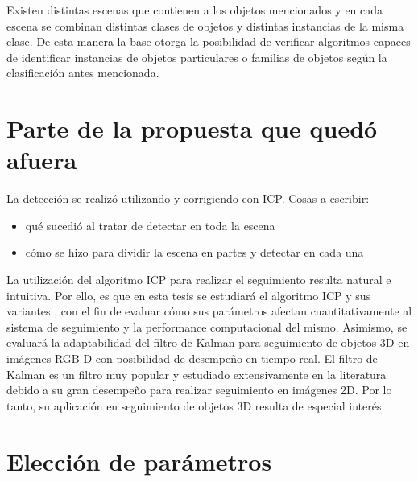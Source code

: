 Existen distintas escenas que contienen a los objetos mencionados y en cada escena se combinan distintas clases de objetos y distintas instancias de la misma clase. De esta manera la base otorga la posibilidad de verificar algoritmos capaces de identificar instancias de objetos particulares o familias de objetos según la clasificación antes mencionada.






\section{Parte de la propuesta que quedó afuera}



La detección se realizó utilizando \cite{6630856} y corrigiendo con ICP.
Cosas a escribir:
\begin{itemize}
	\item qué sucedió al tratar de detectar en toda la escena
	\item cómo se hizo para dividir la escena en partes y detectar en cada una
\end{itemize}


La utilización del algoritmo ICP \cite{zhang94icp,besl92icp} para realizar el seguimiento resulta natural e intuitiva. Por ello, es que en esta tesis se estudiará el algoritmo ICP y sus variantes \cite{estepar2004robust,segal2009generalized}, con el fin de evaluar cómo sus parámetros afectan cuantitativamente al sistema de seguimiento y la performance computacional del mismo. Asimismo, se evaluará la adaptabilidad del filtro de Kalman \cite{welch1995introduction} para seguimiento de objetos 3D en imágenes RGB-D con posibilidad de desempeño en tiempo real. El filtro de Kalman es un filtro muy popular y estudiado extensivamente en la literatura \cite{julier1997new,wan2000unscented} debido a su gran desempeño para realizar seguimiento en imágenes 2D. Por lo tanto, su aplicación en seguimiento de objetos 3D resulta de especial interés.

\section{Elección de parámetros}\label{eleccion_parametros}

